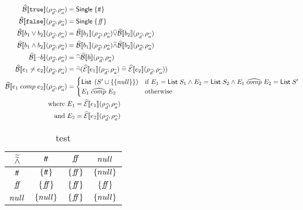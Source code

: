 \begin{align}
    \absboolsem{\texttt{true}}(\rho_{\ab{d}}, \rho_{\ab{a}}) &= \mathsf{Single} \; \{\true\} \label{eq:abstract-bool-semantics-start} \\
    \absboolsem{\texttt{false}}(\rho_{\ab{d}}, \rho_{\ab{a}}) &= \mathsf{Single} \; \{\false\} \\
    \absboolsem{b_1 \lor b_2}(\rho_{\ab{d}}, \rho_{\ab{a}}) &= \absboolsem{b_1}(\rho_{\ab{d}}, \rho_{\ab{a}}) \ab{\lor} \absboolsem{b_2}(\rho_{\ab{d}}, \rho_{\ab{a}}) \\
    \absboolsem{b_1 \land b_2}(\rho_{\ab{d}}, \rho_{\ab{a}}) &= \absboolsem{b_1}(\rho_{\ab{d}}, \rho_{\ab{a}}) \ab{\land} \absboolsem{b_2}(\rho_{\ab{d}}, \rho_{\ab{a}}) \\
    \absboolsem{\neg b}(\rho_{\ab{d}}, \rho_{\ab{a}}) &= \ab{\neg} \absboolsem{b}(\rho_{\ab{d}}, \rho_{\ab{a}}) \\
    \absboolsem{e_1 \neq e_2}(\rho_{\ab{d}}, \rho_{\ab{a}}) &= \ab{\neg}(\absexpsem{e_1}(\rho_{\ab{d}}, \rho_{\ab{a}}) \;\ab{=}\; \absexpsem{e_2}(\rho_{\ab{d}}, \rho_{\ab{a}})) \label{eq:abstract-bool-semantics-end1} \\
    \absboolsem{e_1 \;comp\; e_2}(\rho_{\ab{d}}, \rho_{\ab{a}}) &=
    \begin{cases}
        \mathsf{List} \; \left(S' \cup \{\{null\}\} \right) & \text{if } E_1 = \mathsf{List} \; S_1 \land E_2 = \mathsf{List} \; S_2 \land E_1 \;\ab{\comp}\; E_2 = \mathsf{List} \; S'\\
        E_1 \;\ab{\comp}\; E_2 & \text{otherwise}\\
    \end{cases}\label{eq:abstract-bool-semantics-end2} \\
    \text{where } & E_1 = \absexpsem{e_1}(\rho_{\ab{d}}, \rho_{\ab{a}}) \\
    \text{and } & E_2 = \absexpsem{e_2}(\rho_{\ab{d}}, \rho_{\ab{a}})
\end{align}

\begin{table}[H]
    \centering
    \caption{test}
    \begin{tabular}{c|ccc}
        $\widetilde{\widetilde{\land}}$ & $t\!t$ & $f\!\!f$ & $null$ \\
        \hline
        $t\!t$ & $\{t\!t\}$ & $\{f\!\!f\}$ & $\{null\}$ \\
        $f\!\!f$ & $\{f\!\!f\}$ & $\{f\!\!f\}$ & $\{f\!\!f\}$ \\
        $null$ & $\{null\}$ & $\{f\!\!f\}$ & $\{null\}$ \\
    \end{tabular}
    \label{tab:aaabland}
\end{table}

